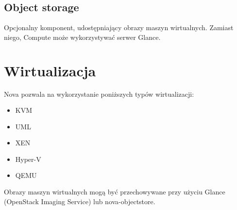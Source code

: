\subsection{Object storage}
Opcjonalny komponent, udostępniający obrazy maszyn wirtualnych. Zamiast niego, Compute może wykorzystywać serwer Glance.

\section{Wirtualizacja}

Nova pozwala na wykorzystanie poniższych typów wirtualizacji\cite{nova_manual}:

\begin{itemize}
\item{KVM}
\item{UML}
\item{XEN}
\item{Hyper-V}
\item{QEMU}
\end{itemize}

Obrazy maszyn wirtualnych mogą być przechowywane przy użyciu Glance (OpenStack Imaging Service) lub nova-objectstore.



	


